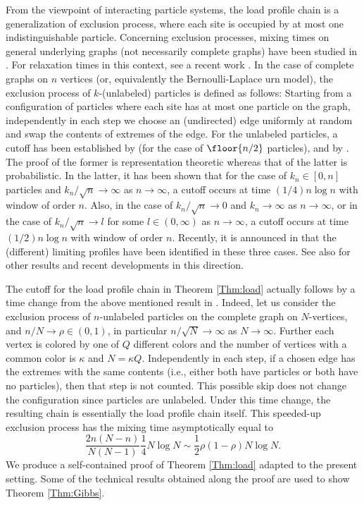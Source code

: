 \documentclass[12pt, reqno]{amsart}
\begin{document}
From the viewpoint of interacting particle systems,
the load profile chain is a generalization of exclusion process,
where each site is occupied by at most one indistinguishable particle.
Concerning exclusion processes, mixing times on general underlying graphs (not necessarily complete graphs) have been studied in \cite{Oliveira}.
For relaxation times in this context,  see a recent work \cite{KanegaeWachi}.
In the case of complete graphs on $n$ vertices
(or, equivalently the Bernoulli-Laplace urn model),
the exclusion process of $k$-(unlabeled) particles is defined as follows:
Starting from a configuration of particles where each site has at most one particle on the graph,
independently in each step we choose an (undirected) edge uniformly at random and swap the contents of extremes of the edge.
For the unlabeled particles,
a cutoff has been established by \cite[Theorem 1]{DiaconisShahshahaniBernoulliLaplace}
(for the case of $\floor{n/2}$ particles),
and by \cite[Theorem 1.1]{LacoinLeblond}.
The proof of the former is representation theoretic whereas that of the latter is probabilistic.
In the latter, it has been shown that for the case of $k_n \in [0, n]$ particles and $k_n/\sqrt{n} \to \infty$ as $n \to \infty$,
a cutoff occurs at time $(1/4)n\log n$ with window of order $n$.
Also, in the case of $k_n/\sqrt{n}\to 0$ and $k_n\to \infty$ as $n \to \infty$,
or in the case of $k_n/\sqrt{n} \to l$ for some $l\in (0, \infty)$ as $n \to \infty$,
a cutoff occurs at time $(1/2)n\log n$ with window of order $n$.
Recently, it is announced in \cite{Olesker-Taylor-Schmid}
that the (different) limiting profiles have been identified in these three cases.
See also \cite{NestoridiOleskerTaylor2022} for other results and recent developments in this direction.

The cutoff for the load profile chain in Theorem \ref{Thm:load} actually follows by a time change from the above mentioned result in \cite[Theorem 1.1]{LacoinLeblond}.
Indeed, let us consider the exclusion process of $n$-unlabeled particles on the complete graph on $N$-vertices, and $n/N \to \rho \in (0, 1)$, in particular $n/\sqrt{N} \to \infty$ as $N\to \infty$.
Further each vertex is colored by one of $Q$ different colors and the number of vertices with a common color is $\kappa$ and $N=\kappa Q$.
Independently in each step,
if a chosen edge has the extremes with the same contents (i.e., either both have particles or both have no particles),
then that step is not counted.
This possible skip does not change the
configuration since particles are unlabeled.
Under this time change, the resulting chain is essentially the load profile chain itself.
This speeded-up exclusion process has the mixing time asymptotically equal to
\[
\frac{2n(N-n)}{N(N-1)}\frac{1}{4}N\log N \sim \frac{1}{2}\rho(1-\rho)N\log N.
\]
We produce a self-contained proof of Theorem \ref{Thm:load} adapted to the present setting.
Some of the technical results obtained along the proof are used to show Theorem \ref{Thm:Gibbs}.
\end{document}
